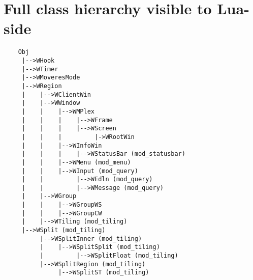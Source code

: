 \chapter{Full class hierarchy visible to Lua-side}
\label{app:fullhierarchy}
  
{\small
\begin{verbatim}
    Obj
     |-->WHook
     |-->WTimer
     |-->WMoveresMode
     |-->WRegion
     |    |-->WClientWin
     |    |-->WWindow
     |    |    |-->WMPlex
     |    |    |    |-->WFrame
     |    |    |    |-->WScreen
     |    |    |         |->WRootWin
     |    |    |-->WInfoWin
     |    |    |    |-->WStatusBar (mod_statusbar)
     |    |    |-->WMenu (mod_menu)
     |    |    |-->WInput (mod_query)
     |    |         |-->WEdln (mod_query)
     |    |         |-->WMessage (mod_query)
     |    |-->WGroup
     |    |    |-->WGroupWS
     |    |    |-->WGroupCW
     |    |-->WTiling (mod_tiling)
     |-->WSplit (mod_tiling)
          |-->WSplitInner (mod_tiling)
          |    |-->WSplitSplit (mod_tiling)
          |         |-->WSplitFloat (mod_tiling)
          |-->WSplitRegion (mod_tiling)
               |-->WSplitST (mod_tiling)
\end{verbatim}
}
